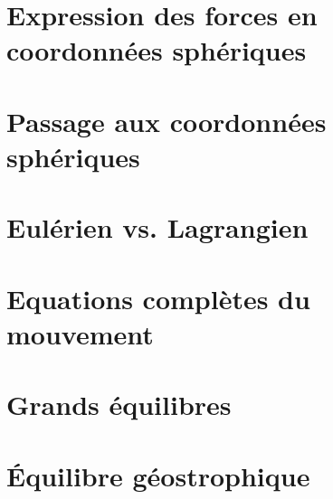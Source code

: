 \documentclass[a4paper,DIV16,10pt]{scrartcl}
\begin{document}
 \inidoc

\newpage
\section{Expression des forces en coordonnées sphériques}


\newpage
\section{Passage aux coordonnées sphériques}


\newpage
\section{Eulérien vs. Lagrangien}

\section{Equations complètes du mouvement}


%
%
%
%	
%
%	

\newpage
\section{Grands équilibres}


\newpage
\section{\'Equilibre géostrophique}

\end{document}
